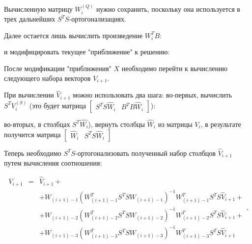 
Вычисленную матрицу $W_i^{(Q)}$ нужно сохранить, поскольку она используется в трех дальнейших $S^TS$-ортогонализациях.

Далее остается лишь вычислить произведение $W_i^T B$:


\noindent и модифицировать текущее "приближение"{} к решению:


После модификации "приближения"{} $X$ необходимо перейти к вычислению следующего набора векторов $V_{i+1}$.

При вычислении $\widehat{V}_{i+1}$ можно использовать два шага: во-первых, вычислить $S^T V_i^{(S)}$ (это будет матрица
$[ \begin{array}{cc} S^T S \widehat{W}_i & B^T B \widehat{W}_i \end{array}]$):


во-вторых, в столбцах $S^T \widehat{W_i}$), вернуть столбцы $\widehat{W}_i$ из матрицы $V_i$, в результате получится матрица
$[ \begin{array}{cc} \widehat{W}_i & S^T S \widehat{W}_i \end{array}]$


Теперь необходимо $S^T S$-ортогонализовать полученный набор столбцов $\widehat{V}_{i+1}$ путем вычисления соотношения:

$$
	\begin{array}{ccl}
		V_{i+1} & = & \widehat{V}_{i+1} + \\
	        &   & + W_{(i+1)-1} \left ( W_{(i+1)-1}^T S^T S W_{(i+1)-1} \right ) ^{-1} W_{(i+1)-1}^T S^T S \widehat{V}_{i+1} + \\
	        &   & + W_{(i+1)-2} \left ( W_{(i+1)-2}^T S^T S W_{(i+1)-2} \right ) ^{-1} W_{(i+1)-2}^T S^T S \widehat{V}_{i+1} + \\
	        &   & + W_{(i+1)-3} \left ( W_{(i+1)-3}^T S^T S W_{(i+1)-3} \right ) ^{-1} W_{(i+1)-3}^T S^T S \widehat{V}_{i+1}
	\end{array}
	,
$$

